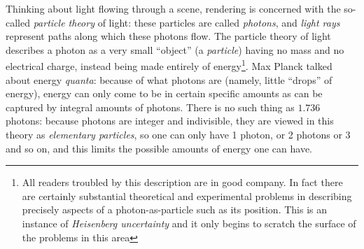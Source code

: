 Thinking about light flowing through a scene, rendering is concerned with the so-called
\textsl{particle theory} of light: these particles are called \textsl{photons}, 
and \textsl{light rays} represent paths along which these photons flow.
The particle theory of light describes a photon as a very small ``object'' 
(a \textsl{particle}) having no mass and no electrical charge, 
instead being made entirely of energy\footnote{
	All readers troubled by this description are in good company. In fact there are 
	certainly substantial theoretical and experimental problems in describing precisely
 	aspects of a photon-as-particle such as its position. 
 	This is an instance of \textsl{Heisenberg uncertainty}
 	and it only begins to scratch the surface of the problems in this area}. 
Max Planck talked about energy \textsl{quanta}: because of what photons are 
(namely, little ``drops'' of energy), 
energy can only come to be in certain specific amounts as can be captured by integral 
amounts of photons. There is no such thing as $1.736$ photons: because photons are integer and 
indivisible, they are viewed in this theory as \textsl{elementary particles}, 
so one can only have 1 photon, or 2 photons or 3 and so on, and this limits the possible
amounts of energy one can have.


